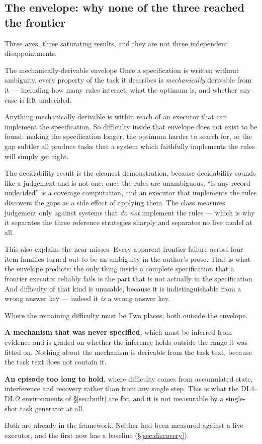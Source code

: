 \documentclass[11pt]{article}
\theoremstyle{definition}
\newcommand{\Om}{\ensuremath{\Omega}}
\begin{document}
\subsection{The envelope: why none of the three reached the frontier}\label{sec:envelope}

Three axes, three saturating results, and they are not three independent disappointments.

\begin{claimbox}{The mechanically-derivable envelope}
Once a specification is written without ambiguity, every property of the task it describes is \emph{mechanically} derivable from it --- including how many rules interact, what the optimum is, and whether any case is left undecided.

Anything mechanically derivable is within reach of an executor that can implement the specification. So difficulty inside that envelope does not exist to be found: making the specification longer, the optimum harder to search for, or the gap subtler all produce tasks that a system which faithfully implements the rules will simply get right.
\end{claimbox}

The decidability result is the cleanest demonstration, because decidability sounds like a judgement and is not one: once the rules are unambiguous, ``is any record undecided'' is a coverage computation, and an executor that implements the rules discovers the gaps as a side effect of applying them. The class measures judgement only against systems that \emph{do not} implement the rules --- which is why it separates the three reference strategies sharply and separates no live model at all.

This also explains the near-misses. Every apparent frontier failure across four item families turned out to be an ambiguity in the author's prose. That is what the envelope predicts: the only thing inside a complete specification that a frontier executor reliably fails is the part that is not actually in the specification. And difficulty of that kind is unusable, because it is indistinguishable from a wrong answer key --- indeed it \emph{is} a wrong answer key.

\begin{cautionbox}{Where the remaining difficulty must be}
Two places, both outside the envelope.

\textbf{A mechanism that was never specified}, which must be inferred from evidence and is graded on whether the inference holds outside the range it was fitted on. Nothing about the mechanism is derivable from the task text, because the task text does not contain it.

\textbf{An episode too long to hold}, where difficulty comes from accumulated state, interference and recovery rather than from any single step. This is what the DL4--DL\Om{} environments of \S\ref{sec:built} are for, and it is not measurable by a single-shot task generator at all.

Both are already in the framework. Neither had been measured against a live executor, and the first now has a baseline (\S\ref{sec:discovery}).
\end{cautionbox}
\end{document}
